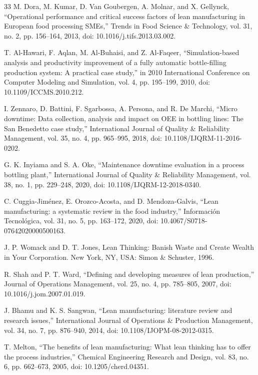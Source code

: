 \documentclass[12pt,a4paper]{article}
\begin{document}
\begin{thebibliography}{33}
M. Dora, M. Kumar, D. Van Goubergen, A. Molnar, and X. Gellynck, ``Operational performance and critical success factors of lean manufacturing in European food processing SMEs,'' Trends in Food Science \& Technology, vol. 31, no. 2, pp. 156--164, 2013, doi: 10.1016/j.tifs.2013.03.002.

T. Al-Hawari, F. Aqlan, M. Al-Buhaisi, and Z. Al-Faqeer, ``Simulation-based analysis and productivity improvement of a fully automatic bottle-filling production system: A practical case study,'' in 2010 International Conference on Computer Modeling and Simulation, vol. 4, pp. 195--199, 2010, doi: 10.1109/ICCMS.2010.212.

I. Zennaro, D. Battini, F. Sgarbossa, A. Persona, and R. De Marchi, ``Micro downtime: Data collection, analysis and impact on OEE in bottling lines: The San Benedetto case study,'' International Journal of Quality \& Reliability Management, vol. 35, no. 4, pp. 965--995, 2018, doi: 10.1108/IJQRM-11-2016-0202.

G. K. Inyiama and S. A. Oke, ``Maintenance downtime evaluation in a process bottling plant,'' International Journal of Quality \& Reliability Management, vol. 38, no. 1, pp. 229--248, 2020, doi: 10.1108/IJQRM-12-2018-0340.

C. Cuggia-Jim\'enez, E. Orozco-Acosta, and D. Mendoza-Galvis, ``Lean manufacturing: a systematic review in the food industry,'' Informaci\'on Tecnol\'ogica, vol. 31, no. 5, pp. 163--172, 2020, doi: 10.4067/S0718-07642020000500163.

J. P. Womack and D. T. Jones, Lean Thinking: Banish Waste and Create Wealth in Your Corporation. New York, NY, USA: Simon \& Schuster, 1996.

R. Shah and P. T. Ward, ``Defining and developing measures of lean production,'' Journal of Operations Management, vol. 25, no. 4, pp. 785--805, 2007, doi: 10.1016/j.jom.2007.01.019.

J. Bhamu and K. S. Sangwan, ``Lean manufacturing: literature review and research issues,'' International Journal of Operations \& Production Management, vol. 34, no. 7, pp. 876--940, 2014, doi: 10.1108/IJOPM-08-2012-0315.

T. Melton, ``The benefits of lean manufacturing: What lean thinking has to offer the process industries,'' Chemical Engineering Research and Design, vol. 83, no. 6, pp. 662--673, 2005, doi: 10.1205/cherd.04351.


\end{thebibliography}
\end{document}
